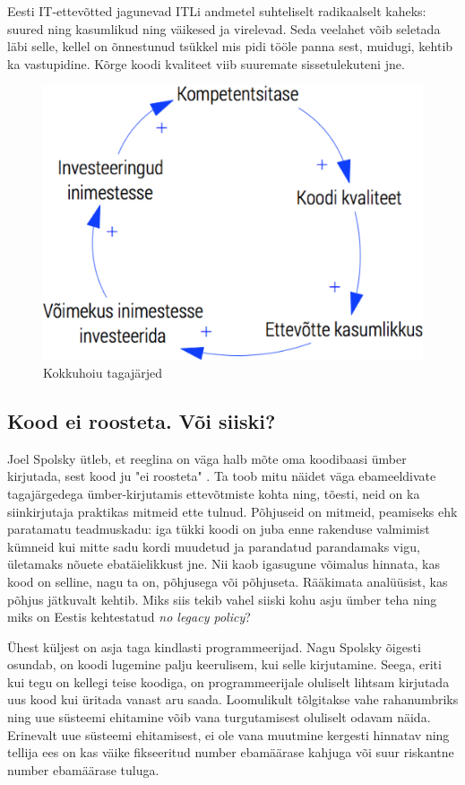 \documentclass{article}
\begin{document}
Eesti IT-ettevõtted jagunevad ITLi andmetel suhteliselt radikaalselt kaheks: suured ning kasumlikud ning väikesed ja virelevad. Seda veelahet võib seletada läbi selle, kellel on õnnestunud tsükkel mis pidi tööle panna sest, muidugi, kehtib ka vastupidine. Kõrge koodi kvaliteet viib suuremate sissetulekuteni jne.

\begin{figure}[htp]
	\begin{center}
		\includegraphics[width=.6\textwidth]{kvaliteet.png}
		\caption{Kokkuhoiu tagajärjed}
		\label{fig:kokkuhoid}
	\end{center}
\end{figure}

\subsection{Kood ei roosteta. Või siiski?}
\label{sec:rooste}
Joel Spolsky ütleb, et reeglina on väga halb mõte oma koodibaasi ümber kirjutada, sest kood ju "ei roosteta" \citep{joelrust}. Ta toob mitu näidet väga ebameeldivate tagajärgedega ümber-kirjutamis ettevõtmiste kohta ning, tõesti, neid on ka siinkirjutaja praktikas mitmeid ette tulnud. Põhjuseid on mitmeid, peamiseks ehk paratamatu teadmuskadu: iga tükki koodi on juba enne rakenduse valmimist kümneid kui mitte sadu kordi muudetud ja parandatud parandamaks vigu, ületamaks nõuete ebatäielikkust jne. Nii kaob igasugune võimalus hinnata, kas kood on selline, nagu ta on, põhjusega või põhjuseta. Rääkimata analüüsist, kas põhjus jätkuvalt kehtib. Miks siis tekib vahel siiski kohu asju ümber teha ning miks on Eestis kehtestatud \emph{no legacy policy}?

Ühest küljest on asja taga kindlasti programmeerijad. Nagu Spolsky õigesti osundab, on koodi lugemine palju keerulisem, kui selle kirjutamine. Seega, eriti kui tegu on kellegi teise koodiga, on programmeerijale oluliselt lihtsam kirjutada uus kood kui üritada vanast aru saada. Loomulikult tõlgitakse vahe rahanumbriks ning uue süsteemi ehitamine võib vana turgutamisest oluliselt odavam näida. Erinevalt uue süsteemi ehitamisest, ei ole vana muutmine kergesti hinnatav ning tellija ees on kas väike fikseeritud number ebamäärase kahjuga või suur riskantne number ebamäärase tuluga. 
\end{document}
